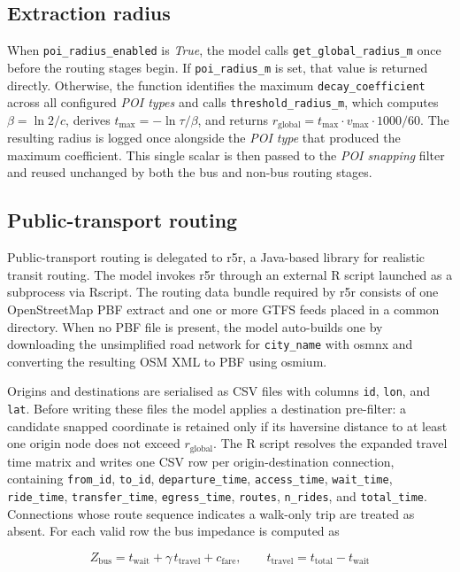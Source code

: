 \documentclass{article}
\begin{document}
\subsection{Extraction radius}
When \texttt{poi\_radius\_enabled} is \emph{True}, the model calls
\texttt{get\_global\_radius\_m} once before the routing stages begin. If
\texttt{poi\_radius\_m} is set, that value is returned directly. Otherwise,
the function identifies the maximum \texttt{decay\_coefficient} across all
configured \emph{POI types} and calls \texttt{threshold\_radius\_m}, which
computes $\beta = \ln 2 / c$, derives $t_{\max} = -\ln\tau / \beta$, and
returns $r_{\text{global}} = t_{\max} \cdot v_{\max} \cdot 1000 / 60$. The
resulting radius is logged once alongside the \emph{POI type} that produced the
maximum coefficient. This single scalar is then passed to the \emph{POI
snapping} filter and reused unchanged by both the bus and non-bus routing
stages.

\subsection{Public-transport routing}
Public-transport routing is delegated to r5r, a Java-based library
for realistic transit routing. The model invokes r5r through an
external R script launched as a subprocess via Rscript. The routing
data bundle required by r5r consists of one OpenStreetMap PBF extract
and one or more GTFS feeds placed in a common directory. When no PBF file is
present, the model auto-builds one by downloading the unsimplified road network
for \texttt{city\_name} with osmnx and converting the resulting OSM
XML to PBF using osmium.

Origins and destinations are serialised as CSV files with columns
\texttt{id}, \texttt{lon}, and \texttt{lat}. Before writing these files the
model applies a destination pre-filter: a candidate snapped coordinate is
retained only if its haversine distance to at least one origin node does not
exceed \(r_{\text{global}}\). The R script resolves the expanded travel time
matrix and writes one CSV row per origin-destination connection, containing
\texttt{from\_id}, \texttt{to\_id}, \texttt{departure\_time},
\texttt{access\_time}, \texttt{wait\_time}, \texttt{ride\_time},
\texttt{transfer\_time}, \texttt{egress\_time}, \texttt{routes},
\texttt{n\_rides}, and \texttt{total\_time}. Connections whose route sequence
indicates a walk-only trip are treated as absent. For each valid row the bus
impedance is computed as

\begin{equation}
    Z_{\text{bus}} = t_{\text{wait}} + \gamma \, t_{\text{travel}} + c_{\text{fare}},
    \qquad t_{\text{travel}} = t_{\text{total}} - t_{\text{wait}}
\end{equation}
\end{document}
